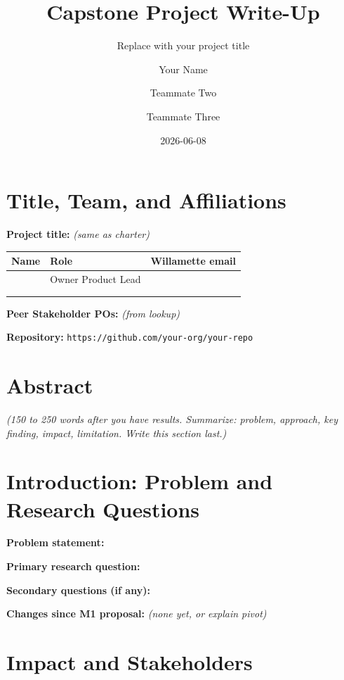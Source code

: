 \documentclass[
  letterpaper,
  DIV=11,
  numbers=noendperiod]{scrartcl}
\title{Capstone Project Write-Up}
\subtitle{Replace with your project title}
\author{Your Name \and Teammate Two \and Teammate Three}
\date{2026-06-08}
\renewcommand*\contentsname{Table of contents}
\newcommand\contentsname{Table of contents}
\begin{document}
\maketitle

\renewcommand*\contentsname{Table of contents}
{
\hypersetup{linkcolor=}
\setcounter{tocdepth}{3}
\tableofcontents
}

\section{Title, Team, and
Affiliations}\label{title-team-and-affiliations}

\textbf{Project title:} \emph{(same as charter)}

\begin{longtable}[]{@{}lll@{}}
\toprule\noalign{}
Name & Role & Willamette email \\
\midrule\noalign{}
\endhead
\bottomrule\noalign{}
\endlastfoot
& Owner Product Lead & \\
& & \\
& & \\
\end{longtable}

\textbf{Peer Stakeholder POs:} \emph{(from lookup)}

\textbf{Repository:} \texttt{https://github.com/your-org/your-repo}

\section{Abstract}\label{abstract}

\emph{(150 to 250 words after you have results. Summarize: problem,
approach, key finding, impact, limitation. Write this section last.)}

\section{Introduction: Problem and Research
Questions}\label{introduction-problem-and-research-questions}

\textbf{Problem statement:}

\textbf{Primary research question:}

\textbf{Secondary questions (if any):}

\textbf{Changes since M1 proposal:} \emph{(none yet, or explain pivot)}

\section{Impact and Stakeholders}\label{impact-and-stakeholders}
\end{document}
